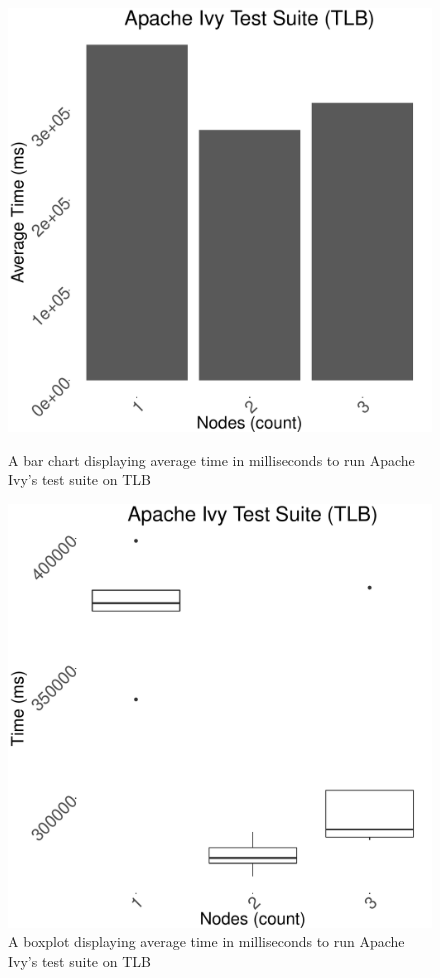 \documentclass{article}
\begin{document}
{\begin{figure}[H]
  \centering
  \begin{minipage}[b]{0.4\textwidth}
    \includegraphics[width=\textwidth]{../data/graphs/ivy_bar_tlb.pdf}
    \caption{A bar chart displaying average time in milliseconds to run Apache Ivy's test suite on TLB}
    \label{ivybar}
  \end{minipage}
  \hfill
  \begin{minipage}[b]{0.4\textwidth}
    \includegraphics[width=\textwidth]{../data/graphs/ivy_boxplot_tlb.pdf}
    \caption{A boxplot displaying average time in milliseconds to run Apache Ivy's test suite on TLB}
    \label{ivybox}
  \end{minipage}
\end{figure}

}
\end{document}
